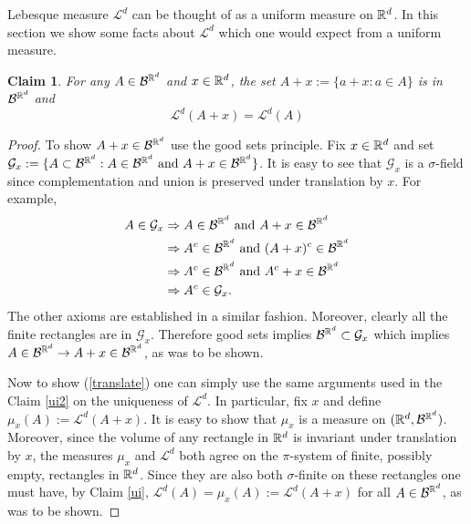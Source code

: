 \documentclass[10pt,letterpaper,twocolumn]{article}
\newtheorem{claim}{Claim}
\begin{document}
Lebesque measure $\mathcal L^d$ can be thought of as a uniform measure on $\Bbb R^d$. In this section we show some facts about $\mathcal L^d$ which one would expect from a uniform measure.
\begin{claim}
For any $A\in\mathcal B^{\Bbb R^d }$ and $x\in \Bbb R^d$, the set $A+x:= \{ a+x: a\in A\}$ is in $\mathcal B^{\Bbb R^d }$ and
\begin{equation}
 \label{translate}
 \mathcal L^d(A+x) =  \mathcal L^d(A) 
 \end{equation}
\end{claim}
\begin{proof}
To show $A+x \in\mathcal B^{\Bbb R^d }$ use the good sets principle. Fix $x\in \Bbb R^d$ and set   $\mathcal G_x:=\{ A\subset \mathcal B^{\Bbb R^d }: A\in \mathcal B^{\Bbb R^d } \text{  and } A+x \in \mathcal B^{\Bbb R^d }\}$. 
It is easy to see that $\mathcal G_x$ is a $\sigma$-field since complementation and union is preserved under translation by $x$. For example,
\begin{align*}
A\in\mathcal G_x &\Rightarrow  A\in \mathcal B^{\Bbb R^d } \text{  and } A+x \in \mathcal B^{\Bbb R^d } \\
&\Rightarrow  A^c\in \mathcal B^{\Bbb R^d } \text{  and } (A+x)^c \in \mathcal B^{\Bbb R^d } \\
&\Rightarrow  A^c\in \mathcal B^{\Bbb R^d } \text{  and } A^c+x \in \mathcal B^{\Bbb R^d } \\
&\Rightarrow A^c\in\mathcal G_x.
\end{align*}
The other axioms are established in a similar fashion.
Moreover, clearly all the finite rectangles are in $\mathcal G_x$. Therefore good sets implies $\mathcal B^{\Bbb R^d } \subset \mathcal G_x$  which implies $A\in \mathcal B^{\Bbb R^d }\rightarrow A+x \in \mathcal B^{\Bbb R^d }$, as was to be shown.

Now to show (\ref{translate}) one can simply use the same arguments used in the Claim \ref{ui2} on the uniqueness of $\mathcal L^d$. In particular, fix $x$ and define $\mu_x(A):= \mathcal L^d(A+x)$. It is easy to show that $\mu_x$ is a measure on $(\Bbb R^d, \mathcal B^{\Bbb R^d })$. Moreover, since the volume of any rectangle in $\Bbb R^d$ is invariant under translation by $x$, the measures $\mu_x$ and $\mathcal L^d$ both agree on the $\pi$-system of finite, possibly empty, rectangles in $\Bbb R^d$. Since they are also both $\sigma$-finite on these rectangles one must have, by Claim \ref{ui}, $\mathcal L^d(A) =\mu_x(A):= \mathcal L^d(A+x) $ for all $A\in\mathcal B^{\Bbb R^d }$, as was to be shown.
\end{proof}
\end{document}
